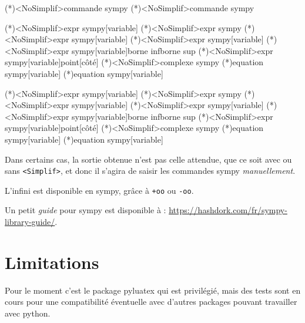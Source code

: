 \documentclass[french,a4paper,11pt]{article}
\begin{document}
\begin{bloctext}
\sympycalc(*)<NoSimplif>{commande sympy}
\dsympycalc(*)<NoSimplif>{commande sympy}

\sympydev(*)<NoSimplif>{expr sympy}[variable]
\sympyfact(*)<NoSimplif>{expr sympy}
\sympyderiv(*)<NoSimplif>{expr sympy}[variable]
\sympyprim(*)<NoSimplif>{expr sympy}[variable]
\sympyintegr(*)<NoSimplif>{expr sympy}[variable]{borne inf}{borne sup}
\sympylim(*)<NoSimplif>{expr sympy}[variable]{point}[côté]
\sympyfexpo(*)<NoSimplif>{complexe sympy}
\sympyresol(*){equation sympy}[variable]
\sympyresolC(*){equation sympy}[variable]

\dsympydev(*)<NoSimplif>{expr sympy}[variable]
\dsympyfact(*)<NoSimplif>{expr sympy}
\dsympyderiv(*)<NoSimplif>{expr sympy}[variable]
\dsympyprim(*)<NoSimplif>{expr sympy}[variable]
\dsympyintegr(*)<NoSimplif>{expr sympy}[variable]{borne inf}{borne sup}
\dsympylim(*)<NoSimplif>{expr sympy}[variable]{point}[côté]
\dsympyfexpo(*)<NoSimplif>{complexe sympy}
\dsympyresol(*){equation sympy}[variable]
\dsympyresolC(*){equation sympy}[variable]
\end{bloctext}

\begin{importantblock}
Dans certains cas, la sortie obtenue n'est pas celle attendue, que ce soit avec ou sans \texttt{<Simplif>}, et donc il s'agira de saisir les commandes \textsf{sympy} \textit{manuellement}.
\end{importantblock}

\begin{tipblock}
L'\og infini \fg{} est disponible en \textsf{sympy}, grâce à \texttt{+oo} ou \texttt{-oo}.

\smallskip

Un petit \textit{guide} pour \textsf{sympy} est disponible à : \url{https://hashdork.com/fr/sympy-library-guide/}.
\end{tipblock}

\newpage

\section{Limitations}

\begin{warningblock}
Pour le moment c'est le package \textsf{pyluatex} qui est privilégié, mais des tests sont en cours pour une compatibilité éventuelle avec d'autres packages pouvant travailler avec \textsf{python}.
\end{warningblock}
\end{document}

